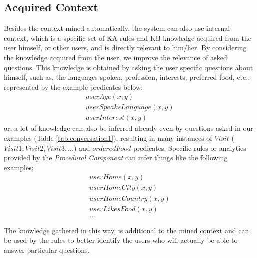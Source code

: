 \subsection{Acquired Context}
\label{section:acquiredContext}
Besides the context mined automatically, the system can also use internal 
context, which is a specific set of KA rules and KB knowledge acquired from
the user himself, or other users, and is directly relevant to him/her. 
By considering the knowledge acquired from the user, we improve the relevance of 
asked questions. 
This knowledge is obtained by asking the user specific questions about himself,
such as, the languages spoken, profession, interests, preferred food, etc.,
represented by the example predicates below:
\begin{equation*}
\begin{gathered}
	userAge(x,y) \\	
	userSpeaksLanguage(x,y) \\
	userInterest(x,y)
\end{gathered}
\end{equation*}
or, a lot of knowledge can also be inferred already even by questions asked
in our examples (Table \ref{tab:conversation1}), resulting in many instances of
$Visit$ ($Visit1,Visit2,Visit3,...$) and $orderedFood$ predicates.
Specific rules or analytics provided by the \emph{Procedural Component} can
infer things like the following examples:
\begin{equation*}
\begin{gathered}
	userHome(x,y) \\
	userHomeCity(x,y) \\
	userHomeCountry(x,y) \\
	userLikesFood(x,y) \\
	...
\end{gathered}
\end{equation*}

The knowledge gathered in this way, is additional to the mined context and can 
be used by the rules to better identify the users who will actually be able to 
answer particular questions.


